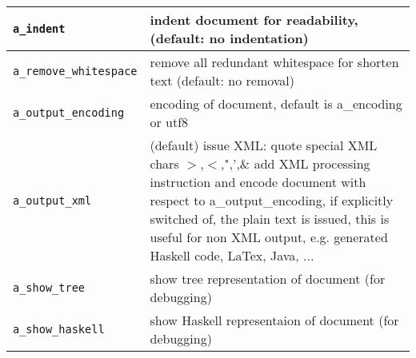 \documentclass[11pt,a4paper,headsepline, bibtotoc]{scrreprt}
\begin{document}
\begin{longtable}{|l|p{}|}
\texttt{a\_indent} & indent document for readability, (default: no indentation)\\ \hline 
\texttt{a\_remove\_whitespace} & remove all redundant whitespace for shorten text (default: no removal)\\ \hline 
\texttt{a\_output\_encoding} & encoding of document, default is a\_encoding or utf8\\ \hline 
\texttt{a\_output\_xml} & (default) issue XML: quote special XML chars $>$,$<$,",',\& add XML processing instruction and encode document with respect to a\_output\_encoding, if explicitly switched of, the plain text is issued, this is useful for non XML output, e.g. generated Haskell code, LaTex, Java, ...\\ \hline 
\texttt{a\_show\_tree} & show tree representation of document (for debugging)\\ \hline 
\texttt{a\_show\_haskell} & show Haskell representaion of document (for debugging)\\ \hline 
\end{longtable}  



\end{document}
